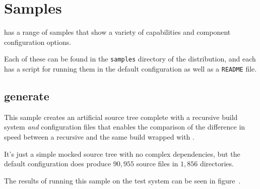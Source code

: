 %
%
%
%
\chapter{Samples}\label{chap:samples}

\lmsbw has a range of samples that show a variety of capabilities and
component configuration options.

Each of these can be found in the \texttt{samples} directory of the
\lmsbw distribution, and each has a script for running them in the
default configuration as well as a \texttt{README} file.


\section{generate}\label{samples:generate}

This sample creates an artificial source tree complete with a
recursive \make build system \emph{and} \lmsbw configuration files
that enables the comparison of the difference in speed between a
recursive \make and the same build wrapped with \lmsbw.

It's just a simple mocked source tree with no complex dependencies,
but the default configuration does produce $90,955$ source files in
$1,856$ directories.

The results of running this sample on the test system can be seen in
figure~.

